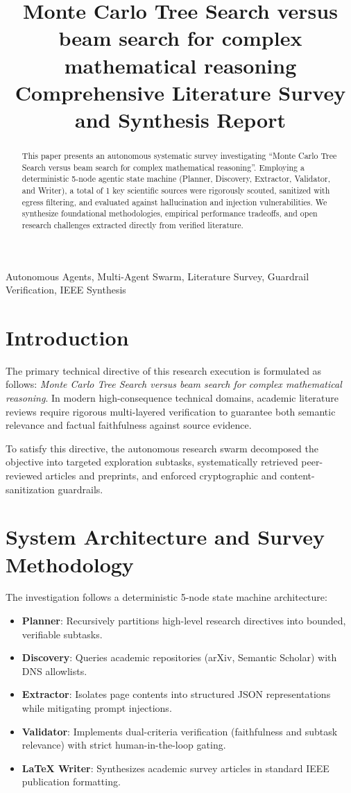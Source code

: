 \documentclass[conference]{IEEEtran}
\title{Monte Carlo Tree Search versus beam search for complex mathematical reasoning\\
\large Comprehensive Literature Survey and Synthesis Report}
\author{\IEEEauthorblockN{Autonomous Multi-Agent Research Swarm}
\IEEEauthorblockA{\textit{Distributed Agentic Intelligence Core} \\
Auto Research Swarm Engine \\
Synthesis Run Date: October 11, 2026 \\
\texttt{swarm-core@autoresearchswarm.com}}
}
\begin{document}
\maketitle

\begin{abstract}
This paper presents an autonomous systematic survey investigating ``Monte Carlo Tree Search versus beam search for complex mathematical reasoning''. Employing a deterministic 5-node agentic state machine (Planner, Discovery, Extractor, Validator, and Writer), a total of 1 key scientific sources were rigorously scouted, sanitized with egress filtering, and evaluated against hallucination and injection vulnerabilities. We synthesize foundational methodologies, empirical performance tradeoffs, and open research challenges extracted directly from verified literature.
\end{abstract}

\begin{IEEEkeywords}
Autonomous Agents, Multi-Agent Swarm, Literature Survey, Guardrail Verification, IEEE Synthesis
\end{IEEEkeywords}

\section{Introduction}
The primary technical directive of this research execution is formulated as follows: \textit{Monte Carlo Tree Search versus beam search for complex mathematical reasoning}. In modern high-consequence technical domains, academic literature reviews require rigorous multi-layered verification to guarantee both semantic relevance and factual faithfulness against source evidence.

To satisfy this directive, the autonomous research swarm decomposed the objective into targeted exploration subtasks, systematically retrieved peer-reviewed articles and preprints, and enforced cryptographic and content-sanitization guardrails.

\section{System Architecture and Survey Methodology}
The investigation follows a deterministic 5-node state machine architecture:
\begin{itemize}
  \item \textbf{Planner}: Recursively partitions high-level research directives into bounded, verifiable subtasks.
  \item \textbf{Discovery}: Queries academic repositories (arXiv, Semantic Scholar) with DNS allowlists.
  \item \textbf{Extractor}: Isolates page contents into structured JSON representations while mitigating prompt injections.
  \item \textbf{Validator}: Implements dual-criteria verification (faithfulness and subtask relevance) with strict human-in-the-loop gating.
  \item \textbf{LaTeX Writer}: Synthesizes academic survey articles in standard IEEE publication formatting.
\end{itemize}
\end{document}

